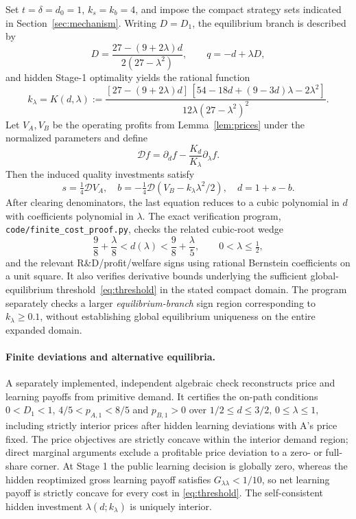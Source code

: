 \documentclass[11pt,a4paper]{article}
\numberwithin{equation}{section}
\theoremstyle{remark}
\newcommand{\kl}{k_{\lambda}}
\begin{document}
Set $t=\delta=d_0=1$, $k_s=k_b=4$, and impose the compact strategy sets indicated in Section~\ref{sec:mechanism}. Writing $D=D_1$, the equilibrium branch is described by
\[
D=\frac{27-(9+2\lambda)d}{2(27-\lambda^2)},\qquad
q=-d+\lambda D,
\]
and hidden Stage-1 optimality yields the rational function
\begin{equation}
\kl=K(d,\lambda):=
\frac{
[27-(9+2\lambda)d]\,
[54-18d+(9-3d)\lambda-2\lambda^2]
}
{12\lambda(27-\lambda^2)^2}.
\label{eq:K}
\end{equation}
Let $V_A,V_B$ be the operating profits from Lemma~\ref{lem:prices} under the normalized parameters and define
\[
\mathcal D f=\partial_d f-\frac{K_d}{K_\lambda}\partial_\lambda f.
\]
Then the induced quality investments satisfy
\[
 s=\tfrac14\mathcal D V_A,\quad
 b=-\tfrac14\mathcal D(V_B-\kl\lambda^2/2),\quad
 d=1+s-b.
\]
After clearing denominators, the last equation reduces to a cubic polynomial in $d$ with coefficients polynomial in $\lambda$. The exact verification program, \texttt{code/finite\_cost\_proof.py}, checks the related cubic-root wedge
\[
\frac98+\frac{\lambda}{8}<d(\lambda)<
\frac98+\frac{\lambda}{5},
\qquad 0<\lambda\le\tfrac12,
\]
and the relevant R\&D/profit/welfare signs using rational Bernstein coefficients on a unit square. It also verifies derivative bounds underlying the sufficient global-equilibrium threshold~\eqref{eq:threshold} in the stated compact domain. The program separately checks a larger \emph{equilibrium-branch} sign region corresponding to $\kl\ge0.1$, without establishing global equilibrium uniqueness on the entire expanded domain.


\paragraph{Finite deviations and alternative equilibria.}
A separately implemented, independent algebraic check reconstructs price and
learning payoffs from primitive demand. It certifies the on-path
conditions $0<D_1<1$, $4/5<p_{A,1}<8/5$ and $p_{B,1}>0$ over
$1/2\le d\le3/2$, $0\le\lambda\le1$, including strictly
interior prices after hidden learning deviations with A's price fixed.
The price objectives are strictly concave within the interior demand
region; direct marginal arguments exclude a profitable price deviation
to a zero- or full-share corner. At Stage 1 the public learning decision
is globally zero, whereas the hidden reoptimized gross learning payoff
satisfies $G_{\lambda\lambda}<1/10$, so net learning payoff is strictly
concave for every cost in \eqref{eq:threshold}. The self-consistent
hidden investment $\lambda(d;\kl)$ is uniquely interior.
\end{document}
